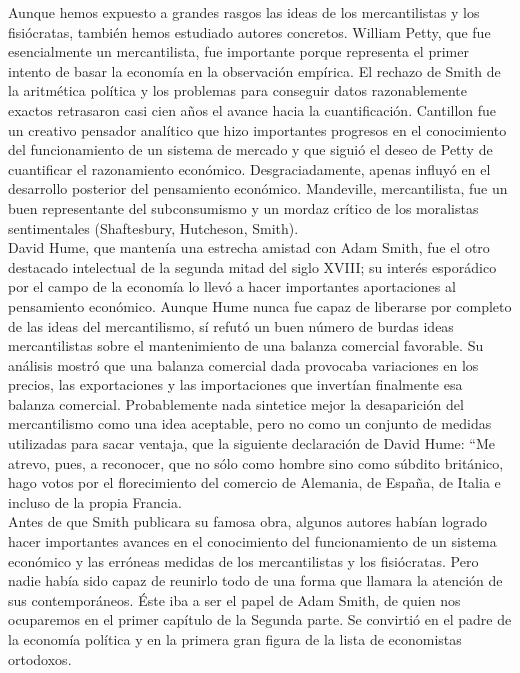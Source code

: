 \documentclass[10pt]{book}
\begin{document}
Aunque hemos expuesto a grandes rasgos las ideas de los mercantilistas y los fisiócratas, también hemos estudiado autores concretos. William Petty, que fue esencialmente un mercantilista, fue importante porque representa el primer intento de basar la economía en la observación empírica. El rechazo de Smith de la aritmética política y los problemas para conseguir datos razonablemente exactos retrasaron casi cien años el avance hacia la cuantificación. Cantillon fue un creativo pensador analítico que hizo importantes progresos en el conocimiento del funcionamiento de un sistema de mercado y que siguió el deseo de Petty de cuantificar el razonamiento económico. Desgraciadamente, apenas influyó en el desarrollo posterior del pensamiento económico. Mandeville, mercantilista, fue un buen representante del subconsumismo y un mordaz crítico de los moralistas sentimentales (Shaftesbury, Hutcheson, Smith).\\
David Hume, que mantenía una estrecha amistad con Adam Smith, fue el otro destacado intelectual de la segunda mitad del siglo XVIII; su interés esporádico por el campo de la economía lo llevó a hacer importantes aportaciones al pensamiento económico. Aunque Hume nunca fue capaz de liberarse por completo de las ideas del mercantilismo, sí refutó un buen número de burdas ideas mercantilistas sobre el mantenimiento de una balanza comercial favorable. Su análisis mostró que una balanza comercial dada provocaba variaciones en los precios, las exportaciones y las importaciones que invertían finalmente esa balanza comercial. Probablemente nada sintetice mejor la desaparición del mercantilismo como una idea aceptable, pero no como un conjunto de medidas utilizadas para sacar ventaja, que la siguiente declaración de David Hume: “Me atrevo, pues, a reconocer, que no sólo como hombre sino como súbdito británico, hago votos por el florecimiento del comercio de Alemania, de España, de Italia e incluso de la propia Francia.\\
Antes de que Smith publicara su famosa obra, algunos autores habían logrado hacer importantes avances en el conocimiento del funcionamiento de un sistema económico y las erróneas medidas de los mercantilistas y los fisiócratas. Pero nadie había sido capaz de reunirlo todo de una forma que llamara la atención de sus contemporáneos. Éste iba a ser el papel de Adam Smith, de quien nos ocuparemos en el primer capítulo de la Segunda parte. Se convirtió en el padre de la economía política y en la primera gran figura de la lista de economistas ortodoxos.
\end{document}
